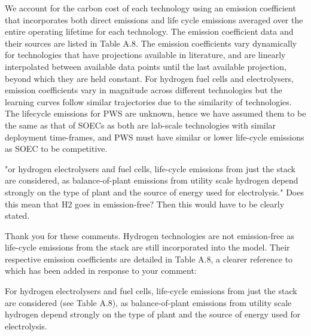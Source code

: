 \documentclass[answers,11pt]{exam}
\begin{document}
\begin{questions}
\begin{solution}
                We account for the carbon cost of each technology using an emission coefficient that incorporates both direct emissions and life cycle emissions averaged over the entire operating lifetime for each technology. The emission coefficient data and their sources are listed in Table A.8. The emission coefficients vary dynamically for technologies that have projections available in literature, and are linearly interpolated between available data points until the last available projection, beyond which they are held constant. For hydrogen fuel cells and electrolysers, emission coefficients vary in magnitude across different technologies but the learning curves follow similar trajectories due to the similarity of technologies. The lifecycle emissions for \gls{PWS} are unknown, hence we have assumed them to be the same as that of \glspl{SOEC} as both are lab-scale technologies with similar deployment time-frames, and \gls{PWS} must have similar or lower life-cycle emissions as \gls{SOEC} to be competitive.
                
                
        \end{solution}
        

        
         \question "or hydrogen electrolysers and fuel cells, life-cycle emissions from just the stack are considered, as balance-of-plant emissions from utility scale hydrogen depend strongly on the type of plant and the source of energy used for electrolysis."
Does this mean that H2 goes in emission-free? Then this would have to be clearly stated.
        \begin{solution}
                Thank you for these comments. Hydrogen technologies are not emission-free as life-cycle emissions from the stack are still incorporated into the model. Their respective emission coefficients are detailed in Table A.8, a clearer reference to which has been added in response to your comment:
                
                For hydrogen electrolysers and fuel cells, life-cycle emissions from just the stack are considered (see Table A.8), as balance-of-plant emissions from utility scale hydrogen depend strongly on the type of plant and the source of energy used for electrolysis. 
                
        \end{solution}      
        
          

\end{questions}
\end{document}
